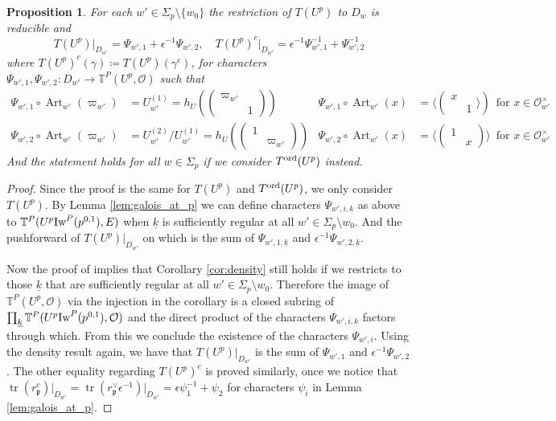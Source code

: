 \documentclass[leqno]{amsart}
\newtheorem{prop}[thm]{Proposition}
\theoremstyle{definition}
\theoremstyle{remark}
\newcommand{\smat}[1]{\left(\begin{smallmatrix} #1 \end{smallmatrix}\right)}
\newcommand{\oo}{\mathcal{O}}
\DeclareMathOperator{\mtr}{tr}
\DeclareMathOperator{\Art}{Art}
\newcommand{\fp}{\mathfrak{p}}
\newcommand{\wt}[1]{\underline{ #1 }}
\newcommand{\Iw}{\textnormal{Iw}} %
\newcommand{\TT}{\mathbb{T}} %
\newcommand{\ord}{\textnormal{ord}} %
\begin{document}
\begin{prop}\label{prop:big_char_at_p}
    For each $w'\in \Sigma_p\setminus\{w_0\}$
    the restriction of $T(U^p)$ to $D_w$
    is reducible and 
    \[
        T(U^p)\vert_{D_{w'}}=\Psi_{w',1}+
        \epsilon^{-1}\Psi_{w',2},\quad
        T(U^p)^c\vert_{D_{w'}}=\epsilon^{-1}\Psi_{w',1}^{-1}+
        \Psi_{w',2}^{-1}
    \]
    where $T(U^p)^c(\gamma)\coloneqq T(U^p)(\gamma^c)$,
    for characters 
    $\Psi_{w',1},\Psi_{w',2}\colon D_{w'}\to \TT^P(U^p,\oo)$
    such that
	\begin{equation}
	\begin{aligned}
		\Psi_{w',1}\circ \Art_{w'}(\varpi_{w'})&=
		U_{w'}^{(1)}=h_U(\smat{\varpi_{w'}&\\&1}) &
		\Psi_{w',1}\circ \Art_{w'}(x)&=
		\langle 
		(\begin{smallmatrix}
			x&\\&1
		\end{smallmatrix}
		\rangle)\, \text{ for }x\in \oo_{w'}^{\times}\\
		\Psi_{w',2}\circ \Art_{w'}(\varpi_{w'})&=
		U_{w'}^{(2)}/
		U_{w'}^{(1)} =h_U(\smat{1&\\&\varpi_{w'}}) &
		\Psi_{w',2}\circ \Art_{w'}(x)&=
		\langle 
		(\begin{smallmatrix}
			1&\\&x
		\end{smallmatrix})
		\rangle\, \text{ for }x\in \oo_{w'}^{\times}
	\end{aligned}
	\end{equation}
    And the statement holds for all $w\in \Sigma_p$
    if we consider $T^{\ord}(U^p)$ instead.
\end{prop}
\begin{proof}

Since the proof is the same for $T(U^p)$ and $T^{\ord}(U^p)$,
we only consider $T(U^p)$.
By Lemma \ref{lem:galois_at_p}
we can define characters $\Psi_{w',i,\wt{k}}$ as above
to $\TT^P(U^p\Iw^P(p^{0,1}),E)$
when $\wt{k}$ is sufficiently regular
at all $w'\in \Sigma_p\setminus{w_0}$.
And the pushforward of $T(U^p)\vert_{D_{w'}}$ on which
is the sum of $\Psi_{w',1,\wt{k}}$ and
$\epsilon^{-1}\Psi_{w',2,\wt{k}}$.

Now the proof of \cite[Cor 3.4]{ger}
implies that Corollary \ref{cor:density} still holds
if we restricts to those $\wt{k}$
that are sufficiently regular
at all $w'\in \Sigma_p\setminus{w_0}$.
Therefore the image of $\TT^P(U^p,\oo)$
via the injection in the corollary
is a closed subring of $\prod_{\wt{k}}\TT^P(U^p\Iw^P(p^{0,1}),\oo)$
and the direct product of the characters
$\Psi_{w',i,\wt{k}}$ factors through which.
From this we conclude the existence 
of the characters $\Psi_{w',i}$.
Using the density result again,
we have that $T(U^p)\vert_{D_{w'}}$
is the sum of $\Psi_{w',1}$ and $\epsilon^{-1}\Psi_{w',2}$.
The other equality regarding $T(U^p)^c$ is proved similarly,
once we notice that
$\mtr(r_\fp^c)\vert_{D_{w'}}=
\mtr(r_\fp^\vee\epsilon^{-1})\vert_{D_{w'}}=
\epsilon\psi_1^{-1}+\psi_2$
for characters $\psi_i$ in Lemma \ref{lem:galois_at_p}.




\end{proof}
\end{document}
